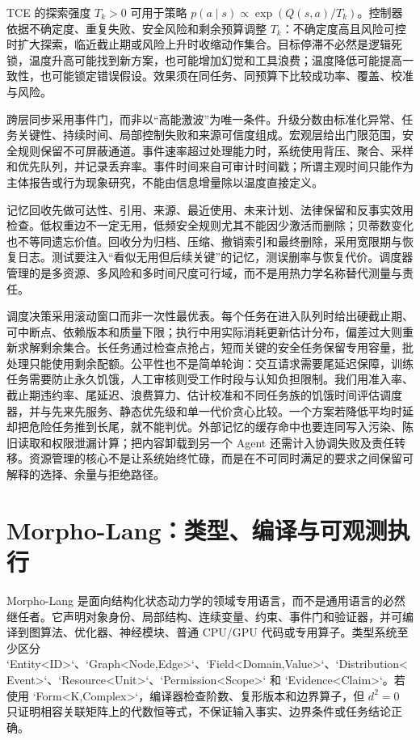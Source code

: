 TCE 的探索强度 $T_k>0$ 可用于策略 $p(a\mid s)\propto\exp(Q(s,a)/T_k)$。控制器依据不确定度、重复失败、安全风险和剩余预算调整 $T_k$：不确定度高且风险可控时扩大探索，临近截止期或风险上升时收缩动作集合。目标停滞不必然是逻辑死锁，温度升高可能找到新方案，也可能增加幻觉和工具浪费；温度降低可能提高一致性，也可能锁定错误假设。效果须在同任务、同预算下比较成功率、覆盖、校准与风险。

跨层同步采用事件门，而非以“高能激波”为唯一条件。升级分数由标准化异常、任务关键性、持续时间、局部控制失败和来源可信度组成。宏观层给出门限范围，安全规则保留不可屏蔽通道。事件速率超过处理能力时，系统使用背压、聚合、采样和优先队列，并记录丢弃率。事件时间来自可审计时间戳；所谓主观时间只能作为主体报告或行为现象研究，不能由信息增量除以温度直接定义。

记忆回收先做可达性、引用、来源、最近使用、未来计划、法律保留和反事实效用检查。低权重边不一定无用，低频安全规则尤其不能因少激活而删除；贝蒂数变化也不等同遗忘价值。回收分为归档、压缩、撤销索引和最终删除，采用宽限期与恢复日志。测试要注入“看似无用但后续关键”的记忆，测误删率与恢复代价。调度器管理的是多资源、多风险和多时间尺度可行域，而不是用热力学名称替代测量与责任。

调度决策采用滚动窗口而非一次性最优表。每个任务在进入队列时给出硬截止期、可中断点、依赖版本和质量下限；执行中用实际消耗更新估计分布，偏差过大则重新求解剩余集合。长任务通过检查点抢占，短而关键的安全任务保留专用容量，批处理只能使用剩余配额。公平性也不是简单轮询：交互请求需要尾延迟保障，训练任务需要防止永久饥饿，人工审核则受工作时段与认知负担限制。我们用准入率、截止期违约率、尾延迟、浪费算力、估计校准和不同任务族的饥饿时间评估调度器，并与先来先服务、静态优先级和单一代价贪心比较。一个方案若降低平均时延却把危险任务推到长尾，就不能判优。外部记忆的缓存命中也要连同写入污染、陈旧读取和权限泄漏计算；把内容卸载到另一个 Agent 还需计入协调失败及责任转移。资源管理的核心不是让系统始终忙碌，而是在不可同时满足的要求之间保留可解释的选择、余量与拒绝路径。

\section{Morpho-Lang：类型、编译与可观测执行}
\label{sec:section_6860}

Morpho-Lang 是面向结构化状态动力学的领域专用语言，而不是通用语言的必然继任者。它声明对象身份、局部结构、连续变量、约束、事件门和验证器，并可编译到图算法、优化器、神经模块、普通 CPU/GPU 代码或专用算子。类型系统至少区分 `Entity<ID>`、`Graph<Node,Edge>`、`Field<Domain,Value>`、`Distribution<Event>`、`Resource<Unit>`、`Permission<Scope>` 和 `Evidence<Claim>`。若使用 `Form<K,Complex>`，编译器检查阶数、复形版本和边界算子，但 $d^2=0$ 只证明相容关联矩阵上的代数恒等式，不保证输入事实、边界条件或任务结论正确。

